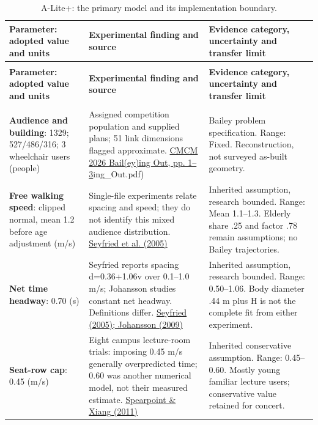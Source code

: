 \documentclass[11pt,a4paper]{article}
\begin{document}
\begingroup\small
\begin{longtable}{@{}>{\raggedright\arraybackslash}p{}>{\raggedright\arraybackslash}p{}>{\raggedright\arraybackslash}p{}@{}}
\caption{A-Lite+: the primary model and its implementation boundary.}\label{tab:9}\\
\toprule
\textbf{Parameter: adopted value and units} & \textbf{Experimental finding and source} & \textbf{Evidence category, uncertainty and transfer limit} \\
\midrule\endfirsthead
\multicolumn{3}{l}{\small\itshape Table \thetable{} continued}\\\toprule
\textbf{Parameter: adopted value and units} & \textbf{Experimental finding and source} & \textbf{Evidence category, uncertainty and transfer limit} \\
\midrule\endhead
\midrule\multicolumn{3}{r}{\small Continued on next page}\\\endfoot
\bottomrule\endlastfoot
\textbf{Audience and building}: 1329; 527/486/316; 3 wheelchair users (people) & Assigned competition population and supplied plans; 51 link dimensions flagged approximate. \href{/CMCM_2026_Bail(ey}{CMCM 2026 Bail(ey)ing Out, pp. 1–3}ing\_Out.pdf) & Bailey problem specification. Range: Fixed. Reconstruction, not surveyed as-built geometry. \\
\textbf{Free walking speed}: clipped normal, mean 1.2 before age adjustment (m/s) & Single-file experiments relate spacing and speed; they do not identify this mixed audience distribution. \href{https://arxiv.org/abs/physics/0506170}{Seyfried et al. (2005)} & Inherited assumption, research bounded. Range: Mean 1.1–1.3. Elderly share .25 and factor .78 remain assumptions; no Bailey trajectories. \\
\textbf{Net time headway}: 0.70 (s) & Seyfried reports spacing d=0.36+1.06v over 0.1–1.0 m/s; Johansson studies constant net headway. Definitions differ. \href{https://arxiv.org/abs/0908.3118}{Seyfried (2005); Johansson (2009)} & Inherited assumption, research bounded. Range: 0.50–1.06. Body diameter .44 m plus H is not the complete fit from either experiment. \\
\textbf{Seat-row cap}: 0.45 (m/s) & Eight campus lecture-room trials: imposing 0.45 m/s generally overpredicted time; 0.60 was another numerical model, not their measured estimate. \href{https://publications.iafss.org/publications/fss/10/599/view}{Spearpoint \& Xiang (2011)} & Inherited conservative assumption. Range: 0.45–0.60. Mostly young familiar lecture users; conservative value retained for concert. \\

\end{longtable}
\end{document}
